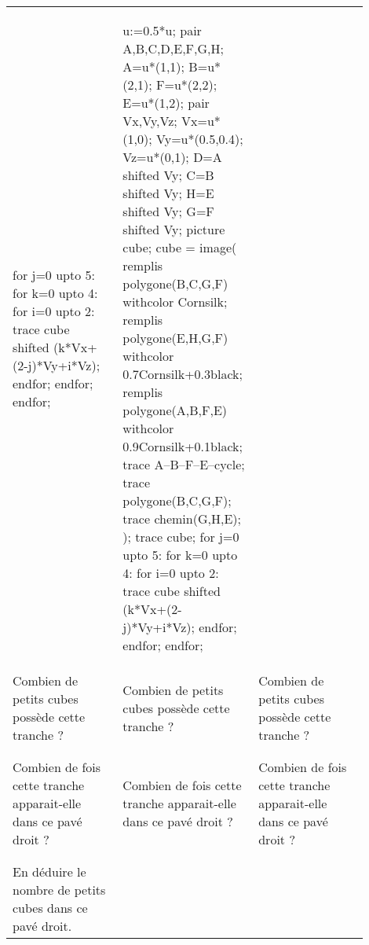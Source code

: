 \begin{changemargin}{-10mm}{-25mm}
\begin{activite}
\begin{tabular}{>{\centering\arraybackslash}p{0.3\linewidth}|>{\centering\arraybackslash}p{0.3\linewidth}|>{\centering\arraybackslash}p{0.3\linewidth}}
\begin{Geometrie}[CoinBG={(-u,-0.5u)},CoinHD={(5u,4u)}]
                for j=0 upto 5:
                    for k=0 upto 4:
                        for i=0 upto 2:
                            trace cube shifted (k*Vx+(2-j)*Vy+i*Vz);
                        endfor;
                    endfor;
                endfor;
            \end{Geometrie}
            &
            \begin{Geometrie}[CoinBG={(-u,-0.5u)},CoinHD={(5u,4u)}]
                u:=0.5*u;
                pair A,B,C,D,E,F,G,H;
                A=u*(1,1);
                B=u*(2,1);
                F=u*(2,2);
                E=u*(1,2);
                pair Vx,Vy,Vz;
                Vx=u*(1,0);
                Vy=u*(0.5,0.4);
                Vz=u*(0,1);
                D=A shifted Vy;
                C=B shifted Vy;
                H=E shifted Vy;
                G=F shifted Vy;
                picture cube;
                cube = image(
                    remplis polygone(B,C,G,F) withcolor Cornsilk;
                    remplis polygone(E,H,G,F) withcolor 0.7Cornsilk+0.3black;
                    remplis polygone(A,B,F,E) withcolor 0.9Cornsilk+0.1black;
                    trace A--B--F--E--cycle;
                    trace polygone(B,C,G,F);
                    trace chemin(G,H,E);
                );        
                trace cube;
                for j=0 upto 5:
                    for k=0 upto 4:
                        for i=0 upto 2:
                            trace cube shifted (k*Vx+(2-j)*Vy+i*Vz);
                        endfor;
                    endfor;
                endfor;
            \end{Geometrie}
            \\
            Combien de petits cubes possède cette tranche ?
            &
            Combien de petits cubes possède cette tranche ?
            &
            Combien de petits cubes possède cette tranche ? \\
            &&\\
            \dotfill & \dotfill & \dotfill \\
            Combien de fois cette tranche apparait-elle dans ce pavé droit ?
            &
            Combien de fois cette tranche apparait-elle dans ce pavé droit ?
            &
            Combien de fois cette tranche apparait-elle dans ce pavé droit ? \\
            &&\\
            \dotfill & \dotfill & \dotfill \\
            En déduire le nombre de petits cubes dans ce pavé droit.

\end{tabular}
\end{activite}
\end{changemargin}

